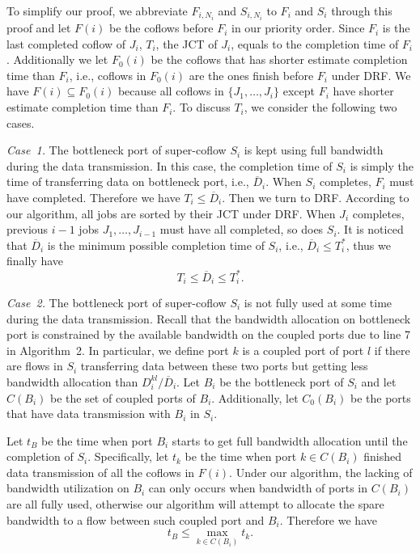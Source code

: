 \documentclass[10pt, conference, letterpaper]{IEEEtran}
\begin{document}
\begin{IEEEproof}
To simplify our proof, we abbreviate $F_{i,N_i}$ and $S_{i,N_i}$ to $F_i$ and $S_i$ through this proof and let $F(i)$ be the coflows before $F_i$ in our priority order. Since $F_i$ is the last completed coflow of $J_i$, $T_i$, the JCT of $J_i$, equals to the completion time of $F_i$. Additionally we let $F_0(i)$ be the coflows that has shorter estimate completion time than $F_i$, i.e., coflows in $F_0(i)$ are the ones finish before $F_i$ under DRF. We have $F(i) \subseteq F_0(i)$ because all coflows in $\{J_1,\dots,J_i\}$ except $F_i$ have shorter estimate completion time than $F_i$. To discuss $T_i$, we consider the following two cases. 

\emph{Case~1.} The bottleneck port of super-coflow $S_i$ is kept using full bandwidth during the data transmission. In this case, the completion time of $S_i$ is simply the time of transferring data on bottleneck port, i.e., $\overline{D}_i$. When $S_i$ completes, $F_i$ must have completed. Therefore we have $T_i \leq \overline{D}_i$. Then we turn to DRF. According to our algorithm, all jobs are sorted by their JCT under DRF. When $J_i$ completes, previous $i-1$ jobs $J_1,\dots,J_{i-1}$ must have all completed, so does $S_i$. It is noticed that $\overline{D}_i$ is the minimum possible completion time of $S_i$, i.e., $\overline{D}_i \leq T_i^*$, thus we finally have
\begin{equation}\label{case1}
	T_i \leq \overline{D}_i \leq T_i^*.
\end{equation}

\emph{Case~2.} The bottleneck port of super-coflow $S_i$ is not fully used at some time during the data transmission. Recall that the bandwidth allocation on bottleneck port is constrained by the available bandwidth on the coupled ports due to line 7 in Algorithm~2. In particular, we define port $k$ is a coupled port of port $l$ if there are flows in $S_i$ transferring data between these two ports but getting less bandwidth allocation than $D_i^{kl}/\overline{D}_i$. Let $B_i$ be the bottleneck port of $S_i$ and let $C(B_i)$ be the set of coupled ports of $B_i$. Additionally, let $C_0(B_i)$ be the ports that have data transmission with $B_i$ in $S_i$.

Let $t_B$ be the time when port $B_i$ starts to get full bandwidth allocation until the completion of $S_i$. Specifically, let $t_k$ be the time when port $k$$\in$$C(B_i)$ finished data transmission of all the coflows in $F(i)$. Under our algorithm, the lacking of bandwidth utilization on $B_i$ can only occurs when bandwidth of ports in $C(B_i)$ are all fully used, otherwise our algorithm will attempt to allocate the spare bandwidth to a flow between such coupled port and $B_i$. Therefore we have
\begin{equation}
	t_B \leq \max_{k \in C(B_i)} t_k.
\end{equation}


\end{IEEEproof}
\end{document}
